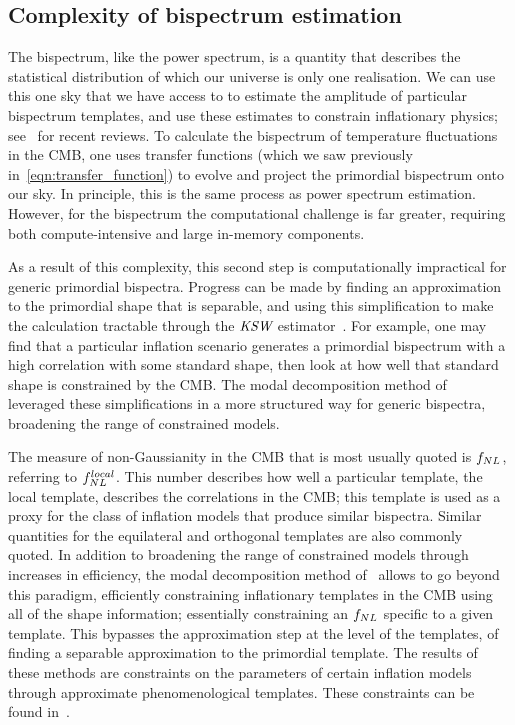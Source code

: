     \subsection{Complexity of bispectrum estimation}
    The bispectrum, like the power spectrum, is a quantity that describes
the statistical distribution of which our universe is only one realisation.
We can use this one sky that we have access to to estimate the amplitude of
particular bispectrum templates,
and use these estimates to constrain inflationary physics; 
see~\cite{astro2020_features,astro2020_png} for recent reviews.
To calculate the bispectrum of temperature fluctuations in the CMB, 
one uses transfer functions
(which we saw previously in~\eqref{eqn:transfer_function})
to evolve and project the primordial bispectrum onto our sky.
In principle, this is the same process as power spectrum estimation.
However, for the bispectrum the computational challenge is far greater,
requiring both compute-intensive and large in-memory components.


As a result of this complexity, this second step is computationally impractical for generic primordial bispectra.
Progress can be made by finding an approximation to the primordial shape
that is separable, and using this simplification
to make the calculation tractable
through the ${\textit{\text{KSW}}}$ estimator~\cite{Komatsu_2005, Munchmeyer_2014}.
For example, one may find that a particular inflation scenario generates
a primordial bispectrum with a high correlation with some standard shape,
then look at how well that standard shape is constrained by the CMB.
The modal decomposition method of~\cite{FergShell_1,FergShell_2,FergShell_3}
leveraged these simplifications in a more structured way
for generic bispectra, broadening the range of constrained models.


The measure of non-Gaussianity in the CMB that is
most usually quoted is $f_{NL}$, referring to $f^{local}_{NL}$.
This number describes how well a particular template, the local template,
describes the correlations in the CMB;
this template is used as a proxy for the class of inflation models that produce similar bispectra.
Similar quantities for the equilateral and orthogonal templates are also
commonly quoted.
In addition to broadening the range of constrained models through increases in efficiency,
the modal decomposition method of~\cite{FergShell_1,FergShell_2,FergShell_3}
allows to go beyond this paradigm, efficiently constraining inflationary templates in the CMB using
all of the shape information; essentially constraining an $f_{NL}$
specific to a given template. This bypasses the approximation step at the level of the templates,
of finding a separable approximation to the primordial template.
The results of these methods are constraints on the parameters of
certain inflation models through approximate phenomenological templates.
These constraints can be found in~\cite{Planck_NG_2015, Planck_NG_2018}.


